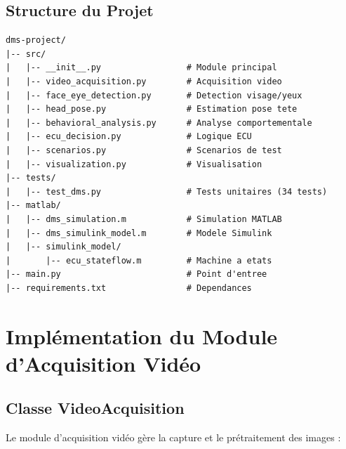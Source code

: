 \subsection{Structure du Projet}

\begin{lstlisting}[style=pythonstyle, caption={Structure du projet DMS.}, label={lst:project_structure}, language={}]
dms-project/
|-- src/
|   |-- __init__.py                 # Module principal
|   |-- video_acquisition.py        # Acquisition video
|   |-- face_eye_detection.py       # Detection visage/yeux
|   |-- head_pose.py                # Estimation pose tete
|   |-- behavioral_analysis.py      # Analyse comportementale
|   |-- ecu_decision.py             # Logique ECU
|   |-- scenarios.py                # Scenarios de test
|   |-- visualization.py            # Visualisation
|-- tests/
|   |-- test_dms.py                 # Tests unitaires (34 tests)
|-- matlab/
|   |-- dms_simulation.m            # Simulation MATLAB
|   |-- dms_simulink_model.m        # Modele Simulink
|   |-- simulink_model/
|       |-- ecu_stateflow.m         # Machine a etats
|-- main.py                         # Point d'entree
|-- requirements.txt                # Dependances
\end{lstlisting}

\section{Implémentation du Module d'Acquisition Vidéo}

\subsection{Classe VideoAcquisition}

Le module d'acquisition vidéo gère la capture et le prétraitement des images :

